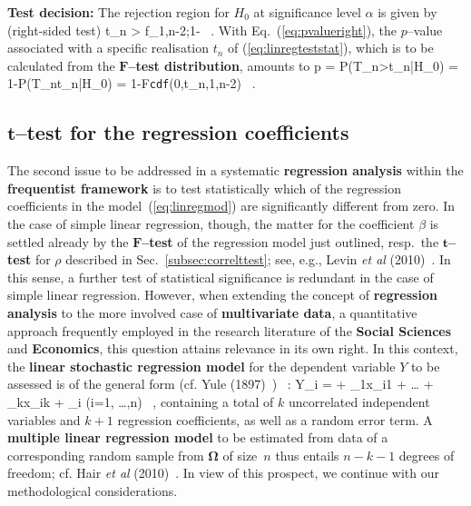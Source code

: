 \medskip
\noindent
\textbf{Test decision:} The rejection region for $H_{0}$ at 
significance level $\alpha$ is given by (right-sided test)
%
\be
t_{n} > f_{1,n-2;1-\alpha} \ .
\ee
%
With Eq.~(\ref{eq:pvalueright}), the $p$--value associated with a 
specific realisation $t_{n}$ of (\ref{eq:linregteststat}), which is
to be calculated from the $\boldsymbol{F}$\textbf{--test
distribution}, amounts 
to
%
\be
p = P(T_{n}>t_{n}|H_{0}) = 1-P(T_{n}\leq t_{n}|H_{0})
= 1-F\texttt{cdf}(0,t_{n},1,n-2) \ .
\ee
%

\subsection[$t$--test for the regression 
coefficients]{$\boldsymbol{t}$--test for the regression 
coefficients}
The second issue to be addressed in a systematic \textbf{regression 
analysis} within the \textbf{frequentist framework} is to test
statistically which of the regression coefficients in the
model~(\ref{eq:linregmod}) are significantly different from zero.
In the case of simple linear regression, though, the matter for the coefficient $\beta$ is settled already 
by the \textbf{$\boldsymbol{F}$--test} of the regression model just 
outlined, resp.~the \textbf{$\boldsymbol{t}$--test} for $\rho$ 
described in Sec.~\ref{subsec:correlttest}; see, e.g., Levin 
\textit{et al} (2010)~. In this sense, a 
further test of statistical significance is redundant in the case 
of simple linear regression. However, when extending the concept 
of \textbf{regression analysis} to the more involved case of
\textbf{multivariate data}, a quantitative approach frequently
employed in the research literature of the \textbf{Social Sciences}
and \textbf{Economics}, this question attains relevance in its own
right. In this context, the \textbf{linear stochastic regression
model} for the dependent variable $Y$ to be assessed is of the
general form (cf. Yule (1897)~)
%
\be
{}
\ \boldsymbol{\Omega}: \quad
Y_{i} = \alpha + \beta_{1}x_{i1} + \ldots
+ \beta_{k}x_{ik} + \varepsilon_{i}
\qquad (i=1, \ldots,n) \ ,
\ee
%
containing a total of $k$ uncorrelated independent variables and 
$k+1$ regression coefficients, as well as a random error term. A 
\textbf{multiple linear regression model} to be estimated from data 
of a corresponding random sample from $\boldsymbol{\Omega}$ of 
size~$n$ thus entails $n-k-1$ degrees of freedom; cf. 
Hair \textit{et al} (2010)~. In view of this 
prospect, we continue with our methodological considerations.

